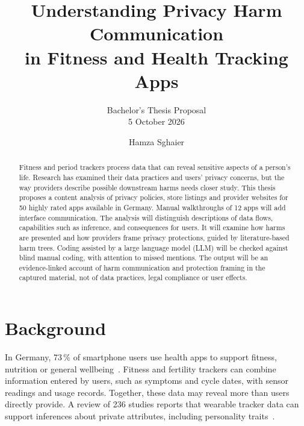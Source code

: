 \documentclass[sigconf,nonacm,natbib=false]{acmart}
\begin{document}
\title[Privacy Harm Communication in Health Tracking Apps]{Understanding
  Privacy Harm Communication\texorpdfstring{\\}{ }in Fitness and Health
  Tracking Apps}
\subtitle{Bachelor's Thesis Proposal\texorpdfstring{\\}{ }5 October 2026}
\author{Hamza Sghaier}
\renewcommand{\shortauthors}{Hamza Sghaier}

\begin{abstract}
Fitness and period trackers process data that can reveal sensitive aspects of
a person's life. Research has examined their data practices and users' privacy
concerns, but the way providers describe possible downstream harms needs
closer study. This thesis proposes a content analysis of privacy policies,
store listings and provider websites for 50 highly rated apps available in
Germany. Manual walkthroughs of 12 apps will add interface communication.
The analysis will distinguish descriptions of data flows, capabilities such as
inference, and consequences for users. It will examine how harms are presented
and how providers frame privacy protections, guided by literature-based harm
trees.
Coding assisted by a large language model (LLM) will be checked against blind
manual coding, with attention to missed mentions. The output will be an
evidence-linked account of harm communication and protection framing in the
captured material, not of data practices, legal compliance or user effects.
\end{abstract}
\maketitle

\section{Background}

In Germany, 73\,\% of smartphone users use health apps to support fitness,
nutrition or general wellbeing~\parencite{bitkom2025health}. Fitness and
fertility trackers can combine information entered by users, such as symptoms
and cycle dates, with sensor readings and usage records. Together, these data
may reveal more than users directly provide. A review of 236 studies reports
that wearable tracker data can support inferences about private attributes,
including personality traits~\parencite{niksirat2024wearable}.
\end{document}
